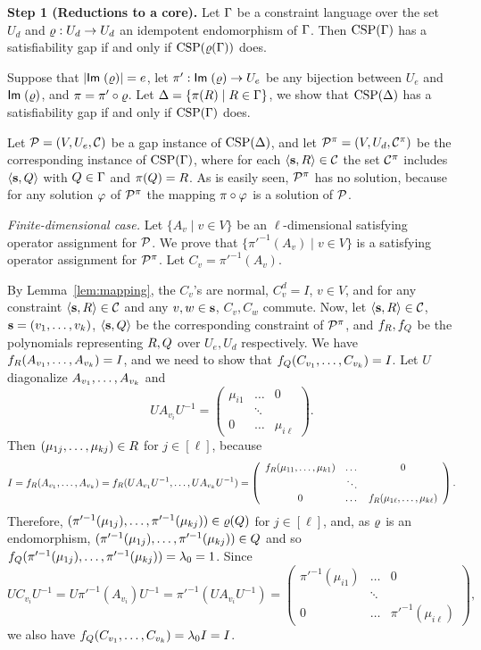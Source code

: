 {\bf Step 1 (Reductions to a core).}
Let $\Gamma$ be a constraint language over the set $U_d$ and $\varrho:U_d\to U_d$ an idempotent
endomorphism of $\Gamma$. Then ${\rm CSP}(\Gamma)$ has a satisfiability gap if and only if ${\rm CSP}(\varrho(\Gamma))$ does.

\smallskip

Suppose that $|{\sf Im}\;(\varrho)|=e$, let $\pi':{\sf Im}\;(\varrho)\to U_e$ be any bijection between $U_e$ and ${\sf Im}\;(\varrho)$, and $\pi=\pi'\circ\varrho$. Let $\Delta=\{\pi(R)\mid R\in\Gamma\}$, we show that ${\rm CSP}(\Delta)$ has a satisfiability gap if and only if ${\rm CSP}(\Gamma)$ does.

Let ${\mathcal P}=(V,U_e,{\mathcal C})$ be a gap instance of ${\rm CSP}(\Delta)$, and let ${\mathcal P}^\pi=(V,U_d,{\mathcal C}^\pi)$ be the corresponding instance of ${\rm CSP}(\Gamma)$, where for each $\langle {\bf s},R \rangle\in{\mathcal C}$ the set ${\mathcal C}^\pi$ includes $\langle {\bf s},Q \rangle$ with $Q\in\Gamma$ and $\pi(Q)=R$. As is easily seen, ${\mathcal P}^\pi$  has no solution, because for any solution $\varphi$ of ${\mathcal P}^\pi$ the mapping $\pi\circ\varphi$ is a solution of ${\mathcal P}$. 

{\it Finite-dimensional case.}
Let $\{A_v\mid v\in V\}$ be an $\ell$-dimensional satisfying operator assignment for ${\mathcal P}$. We prove that $\{\pi'^{-1}(A_v)\mid v\in V\}$ is a satisfying operator assignment for ${\mathcal P}^\pi$. Let $C_v=\pi'^{-1}(A_v)$.

By Lemma~\ref{lem:mapping}, the $C_v$'s are normal, $C_v^d=I$, $v\in V$,
and for any constraint $\langle {\bf s},R \rangle\in{\mathcal C}$ and any $v,w\in{\bf s}$, $C_v,C_w$ commute.
Now, let $\langle {\bf s},R \rangle\in{\mathcal C}$, ${\bf s}=(v _1,\ldots, v _{k})$, $\langle {\bf s},Q \rangle$ be the
corresponding constraint of ${\mathcal P}^\pi$, and $f_R,f_Q$ be the polynomials representing $R,Q$ over $U_e,U_d$ respectively. We have $f_R(A_{v_1},\ldots, A_{v_k})=I$, and we need to show that $f_Q(C_{v_1},\ldots, C_{v_k})=I$. Let $U$ diagonalize $A_{v_1},\ldots, A_{v_k}$ and
\[
UA_{v_i}U^{-1}=\left(\begin{array}{ccc}\mu_{i1}&\dots&0\\ &\ddots&\\ 0&\dots&\mu_{i\ell}\end{array}\right).
\]
Then $(\mu_{1j},\ldots,\mu_{kj})\in R$ for $j\in[\ell]$, because
\[
I=f_R(A_{v_1},\ldots, A_{v_k})=f_R(UA_{v_1}U^{-1},\ldots, UA_{v_k}U^{-1})= \left(\begin{array}{ccc}f_R(\mu_{11},\ldots,\mu_{k1})&\dots&0\\ &\ddots&\\ 0&\dots&f_R(\mu_{1\ell},\ldots,\mu_{k\ell})\end{array}\right).
\]
Therefore, $(\pi'^{-1}(\mu_{1j}),\ldots,\pi'^{-1}(\mu_{kj}))\in\varrho(Q)$ for $j\in[\ell]$, and, as $\varrho$ is an endomorphism, $(\pi'^{-1}(\mu_{1j}),\ldots,\pi'^{-1}(\mu_{kj}))\in Q$ and so $f_Q(\pi'^{-1}(\mu_{1j}),\ldots,\pi'^{-1}(\mu_{kj}))=\lambda_0=1$. Since 
\[
UC_{v_i}U^{-1}=U\pi'^{-1}(A_{v_i})U^{-1}=\pi'^{-1}(UA_{v_i}U^{-1})=\left(\begin{array}{ccc}\pi'^{-1}(\mu_{i1})&\dots&0\\ &\ddots&\\ 0&\dots&\pi'^{-1}(\mu_{i\ell})\end{array}\right),
\]
we also have $f_Q(C_{v_1},\ldots, C_{v_k})=\lambda_0I=I$.

